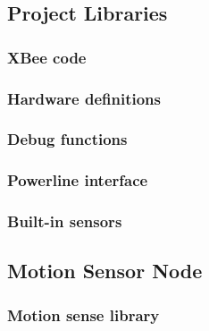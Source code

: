 

\subsection{Project Libraries}
\label{an:project-libs}

\subsubsection{XBee code}



\subsubsection{Hardware definitions}


\subsubsection{Debug functions}



\subsubsection{Powerline interface}



\subsubsection{Built-in sensors}



\pagebreak


\subsection{Motion Sensor Node}
\label{an:motion-code}

\subsubsection{Motion sense library}



